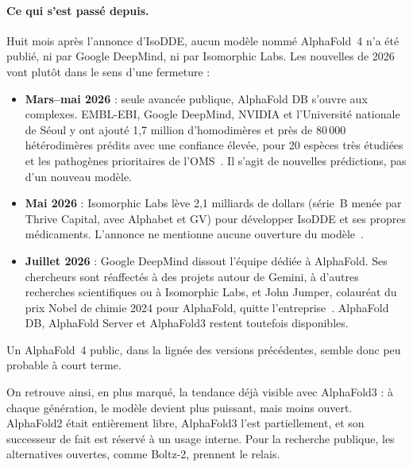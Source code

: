 \paragraph{Ce qui s'est passé depuis.} Huit mois après l'annonce d'IsoDDE, aucun modèle nommé AlphaFold~4 n'a été publié, ni par Google DeepMind, ni par Isomorphic Labs. Les nouvelles de 2026 vont plutôt dans le sens d'une fermeture :
\begin{itemize}
  \item \textbf{Mars--mai 2026} : seule avancée publique, AlphaFold DB s'ouvre aux complexes. EMBL-EBI, Google DeepMind, NVIDIA et l'Université nationale de Séoul y ont ajouté 1,7 million d'homodimères et près de 80\,000 hétérodimères prédits avec une confiance élevée, pour 20 espèces très étudiées et les pathogènes prioritaires de l'OMS~\cite{ebi_complexes2026}. Il s'agit de nouvelles prédictions, pas d'un nouveau modèle.
  \item \textbf{Mai 2026} : Isomorphic Labs lève 2,1 milliards de dollars (série~B menée par Thrive Capital, avec Alphabet et GV) pour développer IsoDDE et ses propres médicaments. L'annonce ne mentionne aucune ouverture du modèle~\cite{eurobiotech2026}.
  \item \textbf{Juillet 2026} : Google DeepMind dissout l'équipe dédiée à AlphaFold. Ses chercheurs sont réaffectés à des projets autour de Gemini, à d'autres recherches scientifiques ou à Isomorphic Labs, et John Jumper, colauréat du prix Nobel de chimie 2024 pour AlphaFold, quitte l'entreprise~\cite{engadget2026,gigazine2026}. AlphaFold DB, AlphaFold Server et AlphaFold3 restent toutefois disponibles.
\end{itemize}
Un AlphaFold~4 public, dans la lignée des versions précédentes, semble donc peu probable à court terme.

On retrouve ainsi, en plus marqué, la tendance déjà visible avec AlphaFold3 : à chaque génération, le modèle devient plus puissant, mais moins ouvert. AlphaFold2 était entièrement libre, AlphaFold3 l'est partiellement, et son successeur de fait est réservé à un usage interne. Pour la recherche publique, les alternatives ouvertes, comme Boltz-2, prennent le relais.
